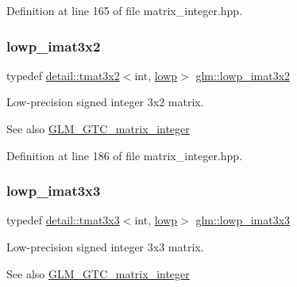 Definition at line 165 of file matrix\+\_\+integer.\+hpp.

\mbox{\label{group__gtc__matrix__integer_ga250780f2be05f698b881b04ba7ce0452}} 
\subsubsection{\texorpdfstring{lowp\+\_\+imat3x2}{lowp\_imat3x2}}
{\footnotesize\ttfamily typedef \hyperlink{structglm_1_1detail_1_1tmat3x2}{detail\+::tmat3x2}$<$int, \hyperlink{namespaceglm_a0f04f086094c747d227af4425893f545ae161af3fc695e696ce3bf69f7332bc2d}{lowp}$>$ \hyperlink{group__gtc__matrix__integer_ga250780f2be05f698b881b04ba7ce0452}{glm\+::lowp\+\_\+imat3x2}}

Low-\/precision signed integer 3x2 matrix. \begin{DoxySeeAlso}{See also}
\hyperlink{group__gtc__matrix__integer}{G\+L\+M\+\_\+\+G\+T\+C\+\_\+matrix\+\_\+integer} 
\end{DoxySeeAlso}


Definition at line 186 of file matrix\+\_\+integer.\+hpp.

\mbox{\label{group__gtc__matrix__integer_gae0d6068aaf9b1f8f06c6cc32941f9471}} 
\subsubsection{\texorpdfstring{lowp\+\_\+imat3x3}{lowp\_imat3x3}}
{\footnotesize\ttfamily typedef \hyperlink{structglm_1_1detail_1_1tmat3x3}{detail\+::tmat3x3}$<$int, \hyperlink{namespaceglm_a0f04f086094c747d227af4425893f545ae161af3fc695e696ce3bf69f7332bc2d}{lowp}$>$ \hyperlink{group__gtc__matrix__integer_gae0d6068aaf9b1f8f06c6cc32941f9471}{glm\+::lowp\+\_\+imat3x3}}

Low-\/precision signed integer 3x3 matrix. \begin{DoxySeeAlso}{See also}
\hyperlink{group__gtc__matrix__integer}{G\+L\+M\+\_\+\+G\+T\+C\+\_\+matrix\+\_\+integer} 
\end{DoxySeeAlso}


